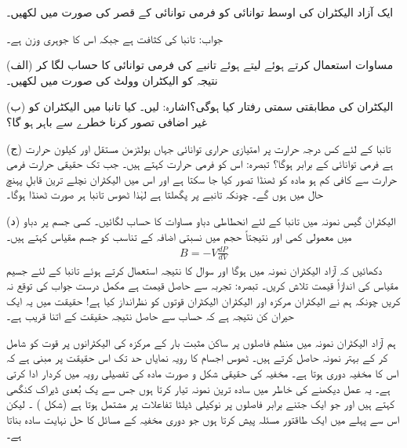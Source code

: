 ایک آزاد الیکٹران کی اوسط توانائی  کو فرمی توانائی کے قصر کی صورت میں لکھیں۔

جواب: 
تانبا کی کثافت  ہے جبکہ اس کا جوہری وزن  ہے۔

(الف) مساوات استعمال کرتے ہوئے  لیتے ہوئے تانبے کی فرمی توانائی کا حساب لگا کر نتیجہ کو الیکٹران وولٹ کی صورت میں لکھیں۔

(ب) الیکٹران کی مطابقتی سمتی رفتار کیا ہوگی؟اشارہ:  لیں۔ کیا تانبا  میں الیکٹران کو غیر اضافی تصور کرنا   خطرے  سے باہر ہو گا؟

(ج) تانبا کے لئے کس درجہ حرارت پر امتیازی حراری توانائی  جہاں  بولٹزمن مستقل اور  کیلون حرارت ہے فرمی توانائی کے برابر ہوگا؟ تبصرہ: اس کو فرمی حرارت کہتے ہیں۔ جب تک حقیقی حرارت فرمی حرارت سے کافی کم ہو مادہ کو ٹھنڈا تصور کیا جا سکتا ہے اور اس میں الیکٹران نچلے ترین قابلِ پہنچ حال میں ہوں گے۔ چونکہ تانبے  پر پگھلتا  ہے لہٰذا ٹھوس تانبا ہر صورت ٹھنڈا ہوگا۔
 
(د) الیکٹران گیس نمونہ میں تانبا کے لئے انحطاطی دباو مساوات  کا حساب لگائیں۔
کسی جسم پر دباو میں معمولی کمی اور نتیجتاً حجم میں نسبتی اضافہ کے تناسب کو جسم مقیاس کہتے ہیں۔
\begin{align*}
	B = -V\frac{dP}{dV}
\end{align*}
دکھائیں کہ آزاد الیکٹران نمونہ میں ہوگا اور سوال کا نتیجہ استعمال کرتے ہوئے تانبا کے لئے جسیم مقیاس کی اندازاً قیمت تلاش کریں۔ تبصرہ: تجربہ سے حاصل قیمت  ہے مکمل درست جواب کی توقع نہ کریں چونکہ ہم نے الیکٹران مرکزہ اور الیکٹران الیکٹران قوتوں کو نظرانداز کیا ہے! حقیقت میں یہ ایک حیران کن نتیجہ ہے کہ حساب سے حاصل نتیجہ حقیقت کے اتنا قریب ہے۔ 

ہم آزاد الیکٹران نمونہ میں منظم فاصلوں پر ساکن مثبت بار کے مرکزہ کی الیکٹرانوں پر قوت کو شامل کر کے بہتر نمونہ حاصل کرتے ہیں۔ ٹھوس اجسام کا رویہ نمایاں حد تک  اس حقیقت پر مبنی ہے کہ اس کا مخفیہ دوری ہوتا ہے۔ مخفیہ کی حقیقی شکل و صورت مادہ کی تفصیلی رویہ میں کردار ادا کرتی ہے۔ یہ عمل دیکھنے کی خاطر میں سادہ ترین نمونہ تیار کرتا ہوں جس سے یک بُعدی ڈیراک کنگھی کہتے ہیں اور جو ایک جتنے برابر فاصلوں پر نوکیلی ڈیلٹا تفاعلات  پر مشتمل ہوتا ہے (شکل ) ۔ لیکن اس سے پہلے میں ایک طاقتور مسئلہ پیش کرتا ہوں جو دوری مخفیہ کے مسائل کا حل نہایت سادہ بناتا ہے۔



